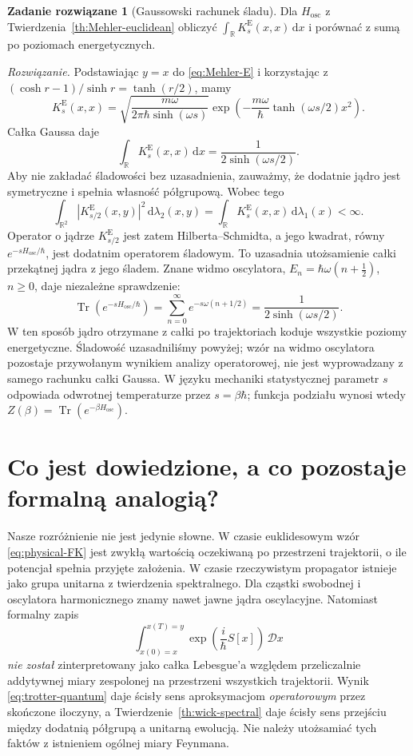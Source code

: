 \documentclass[11pt,a4paper,oneside]{report}
\numberwithin{equation}{chapter}
\theoremstyle{plain}
\theoremstyle{definition}
\newtheorem{zadanie}{Zadanie rozwiązane}[chapter]
\theoremstyle{remark}
\newcommand{\R}{\mathbb{R}}
\newcommand{\dd}{\mathrm{d}}
\begin{document}
\begin{zadanie}[Gaussowski rachunek śladu]
Dla $H_{\mathrm{osc}}$ z
Twierdzenia~\ref{th:Mehler-euclidean} obliczyć
$\int_{\R}K_s^{\mathrm E}(x,x)\,\dd x$ i porównać
z sumą po poziomach energetycznych.

\emph{Rozwiązanie.} Podstawiając $y=x$ do
\eqref{eq:Mehler-E} i korzystając z
$(\cosh r-1)/\sinh r=\tanh(r/2)$, mamy
\[
 K_s^{\mathrm E}(x,x)=
 \sqrt{\frac{m\omega}{2\pi\hbar\sinh(\omega s)}}
 \exp\left(-\frac{m\omega}{\hbar}
     \tanh(\omega s/2)x^2\right).
\]
Całka Gaussa daje
\[
 \int_{\R}K_s^{\mathrm E}(x,x)\,\dd x
 =\frac1{2\sinh(\omega s/2)}.
\]
Aby nie zakładać śladowości bez uzasadnienia,
zauważmy, że dodatnie jądro jest symetryczne i spełnia
własność półgrupową. Wobec tego
\[
\int_{\R^2}|K_{s/2}^{\mathrm E}(x,y)|^2\,
\dd\lambda_2(x,y)=\int_{\R}K_s^{\mathrm E}(x,x)\,
\dd\lambda_1(x)<\infty.
\]
Operator o jądrze $K_{s/2}^{\mathrm E}$ jest zatem
Hilberta--Schmidta, a jego kwadrat, równy
$e^{-sH_{\mathrm{osc}}/\hbar}$, jest dodatnim
operatorem śladowym. To uzasadnia utożsamienie
całki przekątnej jądra z jego śladem.
Znane widmo oscylatora,
$E_n=\hbar\omega(n+\frac12)$, $n\ge0$,
daje niezależne sprawdzenie:
\[
 \operatorname{Tr}(e^{-sH_{\mathrm{osc}}/\hbar})
 =\sum_{n=0}^\infty e^{-s\omega(n+1/2)}
 =\frac1{2\sinh(\omega s/2)}.
\]
W ten sposób jądro otrzymane z całki po trajektoriach
koduje wszystkie poziomy energetyczne. Śladowość
uzasadniliśmy powyżej; wzór na widmo oscylatora
pozostaje przywołanym wynikiem analizy operatorowej,
nie jest wyprowadzany z samego rachunku całki Gaussa.
W języku mechaniki statystycznej parametr $s$ odpowiada
odwrotnej temperaturze przez $s=\beta\hbar$;
funkcja podziału wynosi wtedy
$Z(\beta)=\operatorname{Tr}(e^{-\beta H_{\mathrm{osc}}})$.
\end{zadanie}

\section{Co jest dowiedzione, a co pozostaje formalną analogią?}

Nasze rozróżnienie nie jest jedynie słowne. W czasie
euklidesowym wzór \eqref{eq:physical-FK} jest zwykłą
wartością oczekiwaną po przestrzeni trajektorii, o ile
potencjał spełnia przyjęte założenia. W czasie rzeczywistym
propagator istnieje jako grupa unitarna z twierdzenia
spektralnego. Dla cząstki swobodnej i oscylatora
harmonicznego znamy nawet jawne jądra oscylacyjne.
Natomiast formalny zapis
\[
 \int_{x(0)=x}^{x(T)=y}
  \exp\left(\frac{i}{\hbar}S[x]\right)\,\mathcal D x
\]
\emph{nie został} zinterpretowany jako całka Lebesgue'a
względem przeliczalnie addytywnej miary zespolonej na
przestrzeni wszystkich trajektorii.
Wynik \eqref{eq:trotter-quantum} daje ścisły sens
aproksymacjom \emph{operatorowym} przez skończone iloczyny,
a Twierdzenie~\ref{th:wick-spectral} daje ścisły sens
przejściu między dodatnią półgrupą a unitarną ewolucją.
Nie należy utożsamiać tych faktów z istnieniem
ogólnej miary Feynmana.
\end{document}
